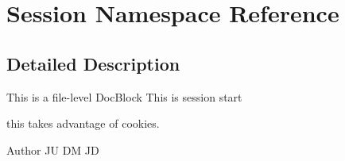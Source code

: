 \hypertarget{namespace_session}{}\section{Session Namespace Reference}
\label{namespace_session}


\subsection{Detailed Description}
This is a file-\/level Doc\+Block This is session start

this takes advantage of cookies.

\begin{DoxyAuthor}{Author}
JU DM JD 
\end{DoxyAuthor}
